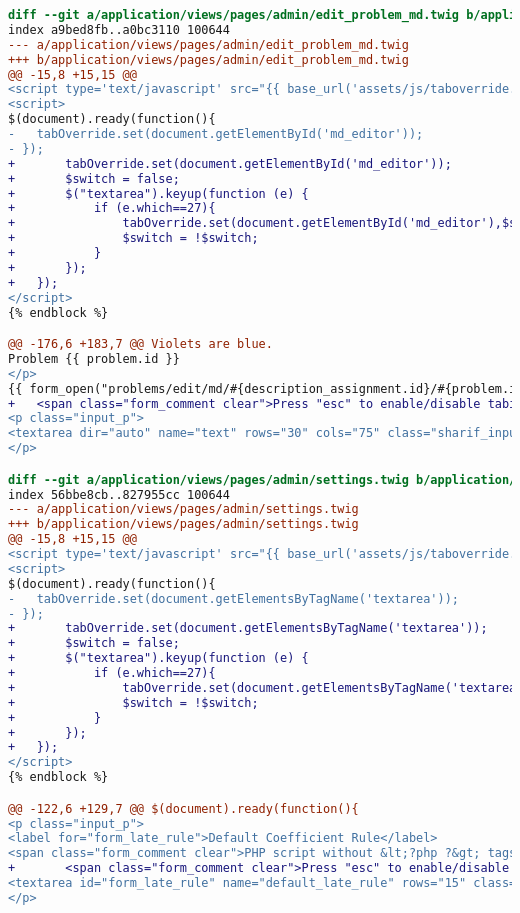 \begin{lstlisting}[language=diff, caption=Perubahan untuk mematuhi kriteria 2.1.2, label=lst_2.1.2, basicstyle=\ttfamily, frame=single,
columns=fullflexible, keepspaces=true, breaklines=true]
diff --git a/application/views/pages/admin/edit_problem_md.twig b/application/views/pages/admin/edit_problem_md.twig
index a9bed8fb..a0bc3110 100644
--- a/application/views/pages/admin/edit_problem_md.twig
+++ b/application/views/pages/admin/edit_problem_md.twig
@@ -15,8 +15,15 @@
<script type='text/javascript' src="{{ base_url('assets/js/taboverride.min.js') }}"></script>
<script>
$(document).ready(function(){
- 	tabOverride.set(document.getElementById('md_editor'));
- });
+ 		tabOverride.set(document.getElementById('md_editor'));
+ 		$switch = false;
+ 		$("textarea").keyup(function (e) {
+ 			if (e.which==27){
+ 				tabOverride.set(document.getElementById('md_editor'),$switch);
+  				$switch = !$switch;
+      		}
+ 		});
+ 	});
</script>
{% endblock %}

@@ -176,6 +183,7 @@ Violets are blue.
Problem {{ problem.id }}
</p>
{{ form_open("problems/edit/md/#{description_assignment.id}/#{problem.id}") }}
+ 	<span class="form_comment clear">Press "esc" to enable/disable tabindent</span><br>
<p class="input_p">
<textarea dir="auto" name="text" rows="30" cols="75" class="sharif_input" id="md_editor">{{ problem.description }}</textarea>
</p>

diff --git a/application/views/pages/admin/settings.twig b/application/views/pages/admin/settings.twig
index 56bbe8cb..827955cc 100644
--- a/application/views/pages/admin/settings.twig
+++ b/application/views/pages/admin/settings.twig
@@ -15,8 +15,15 @@
<script type='text/javascript' src="{{ base_url('assets/js/taboverride.min.js') }}"></script>
<script>
$(document).ready(function(){
- 	tabOverride.set(document.getElementsByTagName('textarea'));
- });
+ 		tabOverride.set(document.getElementsByTagName('textarea'));
+ 		$switch = false;
+ 		$("textarea").keyup(function (e) {
+ 			if (e.which==27){
+ 				tabOverride.set(document.getElementsByTagName('textarea'),$switch);
+  				$switch = !$switch;
+      		}
+ 		});
+ 	});
</script>
{% endblock %}

@@ -122,6 +129,7 @@ $(document).ready(function(){
<p class="input_p">
<label for="form_late_rule">Default Coefficient Rule</label>
<span class="form_comment clear">PHP script without &lt;?php ?&gt; tags</span><br>
+ 		<span class="form_comment clear">Press "esc" to enable/disable tabindent</span><br>
<textarea id="form_late_rule" name="default_late_rule" rows="15" class="sharif_input add_text clear">{{ default_late_rule }}</textarea>
</p>


\end{lstlisting}
